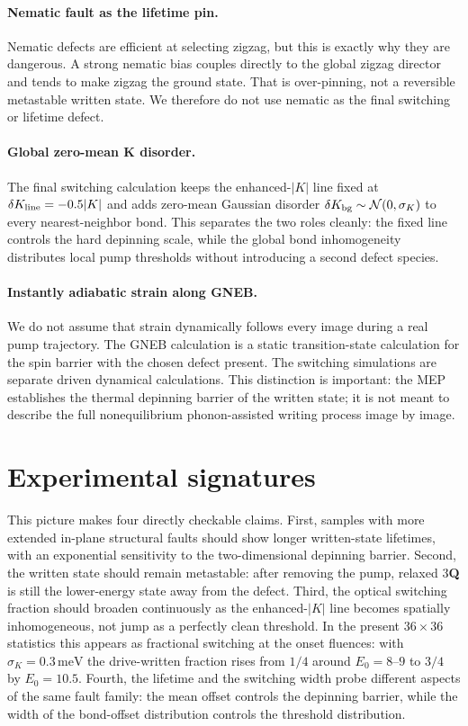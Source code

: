 \documentclass[aps,prb,twocolumn,superscriptaddress,floatfix,nofootinbib]{revtex4-2}
\newcommand{\threeQ}{3\textbf{Q}}
\newcommand{\meV}{\,\mathrm{meV}}
\begin{document}
\paragraph{Nematic fault as the lifetime pin.}
Nematic defects are efficient at selecting zigzag, but this is exactly why they
are dangerous.  A strong nematic bias couples directly to the global zigzag
director and tends to make zigzag the ground state.  That is over-pinning, not a
reversible metastable written state.  We therefore do not use nematic as the
final switching or lifetime defect.

\paragraph{Global zero-mean K disorder.}
The final switching calculation keeps the enhanced-$|K|$ line fixed at
$\delta K_{\rm line}=-0.5|K|$ and adds zero-mean Gaussian disorder
$\delta K_{\rm bg}\sim\mathcal N(0,\sigma_K)$ to every nearest-neighbor bond.
This separates the two roles cleanly: the fixed line controls the hard depinning
scale, while the global bond inhomogeneity distributes local pump thresholds
without introducing a second defect species.

\paragraph{Instantly adiabatic strain along GNEB.}
We do not assume that strain dynamically follows every image during a real pump
trajectory.  The GNEB calculation is a static transition-state calculation for
the spin barrier with the chosen defect present.  The switching simulations are
separate driven dynamical calculations.  This distinction is important: the MEP
establishes the thermal depinning barrier of the written state; it is not meant
to describe the full nonequilibrium phonon-assisted writing process image by
image.

\section{Experimental signatures}

This picture makes four directly checkable claims.  First, samples with more
extended in-plane structural faults should show longer written-state lifetimes,
with an exponential sensitivity to the two-dimensional depinning barrier.  Second,
the written state should remain metastable: after removing the pump, relaxed \threeQ{}
is still the lower-energy state away from the defect.  Third, the optical
switching fraction should broaden continuously as the enhanced-$|K|$ line becomes
spatially inhomogeneous, not jump as a perfectly clean threshold.  In the present
$36\times36$ statistics this appears as fractional switching at the onset
fluences: with $\sigma_K=0.3\meV$ the drive-written fraction rises from $1/4$
around $E_0=8$--$9$ to $3/4$ by $E_0=10.5$.  Fourth, the
lifetime and the switching width probe different aspects of the same fault
family: the mean offset controls the depinning barrier, while the width of the
bond-offset distribution controls the threshold distribution.
\end{document}
